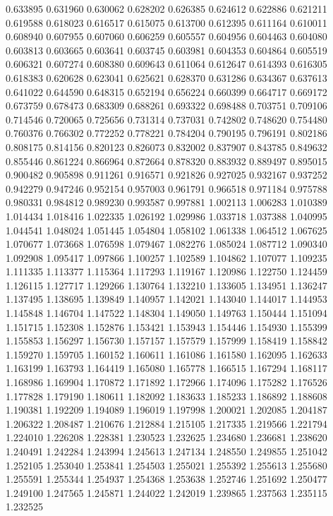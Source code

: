 0.633895
0.631960
0.630062
0.628202
0.626385
0.624612
0.622886
0.621211
0.619588
0.618023
0.616517
0.615075
0.613700
0.612395
0.611164
0.610011
0.608940
0.607955
0.607060
0.606259
0.605557
0.604956
0.604463
0.604080
0.603813
0.603665
0.603641
0.603745
0.603981
0.604353
0.604864
0.605519
0.606321
0.607274
0.608380
0.609643
0.611064
0.612647
0.614393
0.616305
0.618383
0.620628
0.623041
0.625621
0.628370
0.631286
0.634367
0.637613
0.641022
0.644590
0.648315
0.652194
0.656224
0.660399
0.664717
0.669172
0.673759
0.678473
0.683309
0.688261
0.693322
0.698488
0.703751
0.709106
0.714546
0.720065
0.725656
0.731314
0.737031
0.742802
0.748620
0.754480
0.760376
0.766302
0.772252
0.778221
0.784204
0.790195
0.796191
0.802186
0.808175
0.814156
0.820123
0.826073
0.832002
0.837907
0.843785
0.849632
0.855446
0.861224
0.866964
0.872664
0.878320
0.883932
0.889497
0.895015
0.900482
0.905898
0.911261
0.916571
0.921826
0.927025
0.932167
0.937252
0.942279
0.947246
0.952154
0.957003
0.961791
0.966518
0.971184
0.975788
0.980331
0.984812
0.989230
0.993587
0.997881
1.002113
1.006283
1.010389
1.014434
1.018416
1.022335
1.026192
1.029986
1.033718
1.037388
1.040995
1.044541
1.048024
1.051445
1.054804
1.058102
1.061338
1.064512
1.067625
1.070677
1.073668
1.076598
1.079467
1.082276
1.085024
1.087712
1.090340
1.092908
1.095417
1.097866
1.100257
1.102589
1.104862
1.107077
1.109235
1.111335
1.113377
1.115364
1.117293
1.119167
1.120986
1.122750
1.124459
1.126115
1.127717
1.129266
1.130764
1.132210
1.133605
1.134951
1.136247
1.137495
1.138695
1.139849
1.140957
1.142021
1.143040
1.144017
1.144953
1.145848
1.146704
1.147522
1.148304
1.149050
1.149763
1.150444
1.151094
1.151715
1.152308
1.152876
1.153421
1.153943
1.154446
1.154930
1.155399
1.155853
1.156297
1.156730
1.157157
1.157579
1.157999
1.158419
1.158842
1.159270
1.159705
1.160152
1.160611
1.161086
1.161580
1.162095
1.162633
1.163199
1.163793
1.164419
1.165080
1.165778
1.166515
1.167294
1.168117
1.168986
1.169904
1.170872
1.171892
1.172966
1.174096
1.175282
1.176526
1.177828
1.179190
1.180611
1.182092
1.183633
1.185233
1.186892
1.188608
1.190381
1.192209
1.194089
1.196019
1.197998
1.200021
1.202085
1.204187
1.206322
1.208487
1.210676
1.212884
1.215105
1.217335
1.219566
1.221794
1.224010
1.226208
1.228381
1.230523
1.232625
1.234680
1.236681
1.238620
1.240491
1.242284
1.243994
1.245613
1.247134
1.248550
1.249855
1.251042
1.252105
1.253040
1.253841
1.254503
1.255021
1.255392
1.255613
1.255680
1.255591
1.255344
1.254937
1.254368
1.253638
1.252746
1.251692
1.250477
1.249100
1.247565
1.245871
1.244022
1.242019
1.239865
1.237563
1.235115
1.232525
